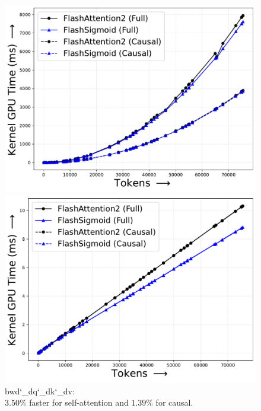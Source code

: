 \begin{figure}[!htbp]
\begin{minipage}{0.24\textwidth}
        \includegraphics[trim={0 0 0 0}, width=\textwidth]{figures/_flash_figures/final_arxiv/f2/individual/a100/A100_noalibi_flash_bwd_dq_dk_dv_loop_seqk_parallel_kernel_Full_3.5_0.06_Causal_1.39_0.08.pdf}
        \captionsetup{justification=centering} 
        \caption*{
            \textrm{bwd\char`_dq\char`_dk\char`_dv}:\\$3.50\%$ faster for self-attention and $1.39\%$ for causal.
        }
    \end{minipage}
    \hfill
    \begin{minipage}{0.24\textwidth}
        \centering        
        \includegraphics[trim={0 0 0 0}, width=\textwidth]{figures/_flash_figures/final_arxiv/f2/individual/a100/A100_noalibi_flash_bwd_dot_do_o_kernel_Full_7.95_0.34_Causal_8.0_0.35.pdf}

\end{minipage}
\end{figure}
